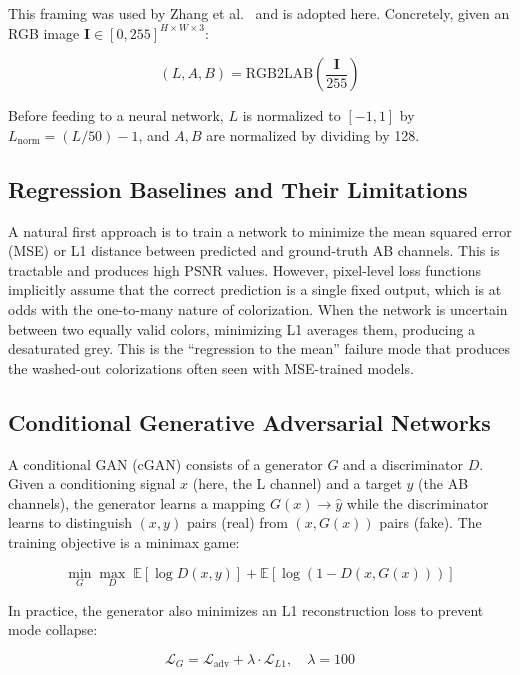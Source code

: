 \documentclass[11pt,a4paper]{article}
\begin{document}
This framing was used by Zhang et al.~\cite{zhang2016colorization} and is adopted
here. Concretely, given an RGB image $\mathbf{I} \in [0,255]^{H \times W \times 3}$:

\begin{equation}
  (L, A, B) = \text{RGB2LAB}\!\left(\frac{\mathbf{I}}{255}\right)
\end{equation}

Before feeding to a neural network, $L$ is normalized to $[-1, 1]$ by
$L_{\text{norm}} = (L / 50) - 1$, and $A, B$ are normalized by dividing by 128.

\subsection{Regression Baselines and Their Limitations}

A natural first approach is to train a network to minimize the mean squared error
(MSE) or L1 distance between predicted and ground-truth AB channels. This is
tractable and produces high PSNR values. However, pixel-level loss functions
implicitly assume that the correct prediction is a single fixed output, which
is at odds with the one-to-many nature of colorization. When the network is
uncertain between two equally valid colors, minimizing L1 averages them, producing
a desaturated grey. This is the ``regression to the mean'' failure mode that
produces the washed-out colorizations often seen with MSE-trained models.

\subsection{Conditional Generative Adversarial Networks}

A conditional GAN (cGAN) consists of a generator $G$ and a discriminator $D$.
Given a conditioning signal $x$ (here, the L channel) and a target $y$ (the AB
channels), the generator learns a mapping $G(x) \to \hat{y}$ while the
discriminator learns to distinguish $(x, y)$ pairs (real) from $(x, G(x))$ pairs
(fake). The training objective is a minimax game:

\begin{equation}
  \min_G \max_D\; \mathbb{E}[\log D(x, y)] + \mathbb{E}[\log(1 - D(x, G(x)))]
\end{equation}

In practice, the generator also minimizes an L1 reconstruction loss to prevent
mode collapse:

\begin{equation}
  \mathcal{L}_G = \mathcal{L}_{\text{adv}} + \lambda \cdot \mathcal{L}_{L1}, \quad \lambda = 100
\end{equation}
\end{document}
